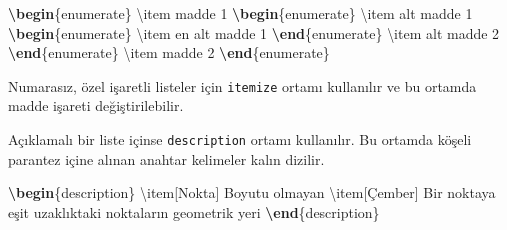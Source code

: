 \documentclass[
  10pt,
]{scrbook}
\newenvironment{Shaded}{\begin{snugshade}}{\end{snugshade}}
\newcommand{\ExtensionTok}[1]{#1}
\newcommand{\FunctionTok}[1]{\textcolor[rgb]{0.00,0.00,0.00}{#1}}
\newcommand{\KeywordTok}[1]{\textcolor[rgb]{0.13,0.29,0.53}{\textbf{#1}}}
\newcommand{\NormalTok}[1]{#1}
\newcommand{\SpecialCharTok}[1]{\textcolor[rgb]{0.00,0.00,0.00}{#1}}
\newcommand{\SpecialStringTok}[1]{\textcolor[rgb]{0.31,0.60,0.02}{#1}}
\theoremstyle{definition}
\theoremstyle{definition}
\theoremstyle{definition}
\theoremstyle{definition}
\theoremstyle{remark}
\begin{document}
\begin{Shaded}
\begin{Highlighting}[]
\KeywordTok{\textbackslash{}begin}\NormalTok{\{}\ExtensionTok{enumerate}\NormalTok{\}}
 \FunctionTok{\textbackslash{}item}\NormalTok{ madde 1}
  \KeywordTok{\textbackslash{}begin}\NormalTok{\{}\ExtensionTok{enumerate}\NormalTok{\}}
    \FunctionTok{\textbackslash{}item}\NormalTok{ alt madde 1}
      \KeywordTok{\textbackslash{}begin}\NormalTok{\{}\ExtensionTok{enumerate}\NormalTok{\}}
        \FunctionTok{\textbackslash{}item}\NormalTok{ en alt madde 1}
      \KeywordTok{\textbackslash{}end}\NormalTok{\{}\ExtensionTok{enumerate}\NormalTok{\}}
    \FunctionTok{\textbackslash{}item}\NormalTok{ alt madde 2}
  \KeywordTok{\textbackslash{}end}\NormalTok{\{}\ExtensionTok{enumerate}\NormalTok{\}}
 \FunctionTok{\textbackslash{}item}\NormalTok{ madde 2}
\KeywordTok{\textbackslash{}end}\NormalTok{\{}\ExtensionTok{enumerate}\NormalTok{\}}
\end{Highlighting}
\end{Shaded}

Numarasız, özel işaretli listeler için \texttt{itemize} ortamı kullanılır ve bu ortamda madde işareti değiştirilebilir.

\begin{Shaded}
\end{Shaded}

Açıklamalı bir liste içinse \texttt{description} ortamı kullanılır. Bu ortamda köşeli parantez içine alınan anahtar kelimeler kalın dizilir.

\begin{Shaded}
\begin{Highlighting}[]
\KeywordTok{\textbackslash{}begin}\NormalTok{\{}\ExtensionTok{description}\NormalTok{\}}
  \FunctionTok{\textbackslash{}item}\NormalTok{[Nokta] Boyutu olmayan}
  \FunctionTok{\textbackslash{}item}\NormalTok{[Çember] Bir noktaya eşit}
\NormalTok{  uzaklıktaki noktaların geometrik yeri}
\KeywordTok{\textbackslash{}end}\NormalTok{\{}\ExtensionTok{description}\NormalTok{\}}
\end{Highlighting}
\end{Shaded}
\end{document}
